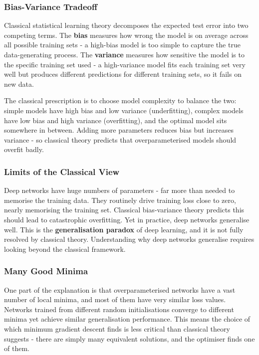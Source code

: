 \subsubsection{Bias-Variance Tradeoff}

Classical statistical learning theory decomposes the expected test error into two competing terms. The \textbf{bias} measures how wrong the model is on average across all possible training sets - a high-bias model is too simple to capture the true data-generating process. The \textbf{variance} measures how sensitive the model is to the specific training set used - a high-variance model fits each training set very well but produces different predictions for different training sets, so it fails on new data.

The classical prescription is to choose model complexity to balance the two: simple models have high bias and low variance (underfitting), complex models have low bias and high variance (overfitting), and the optimal model sits somewhere in between. Adding more parameters reduces bias but increases variance - so classical theory predicts that overparameterised models should overfit badly.

\subsubsection{Limits of the Classical View}

Deep networks have huge numbers of parameters - far more than needed to memorise the training data. They routinely drive training loss close to zero, nearly memorising the training set. Classical bias-variance theory predicts this should lead to catastrophic overfitting. Yet in practice, deep networks generalise well. This is the \textbf{generalisation paradox} of deep learning, and it is not fully resolved by classical theory. Understanding why deep networks generalise requires looking beyond the classical framework.

\subsubsection{Many Good Minima}

One part of the explanation is that overparameterised networks have a vast number of local minima, and most of them have very similar loss values. Networks trained from different random initialisations converge to different minima yet achieve similar generalisation performance. This means the choice of which minimum gradient descent finds is less critical than classical theory suggests - there are simply many equivalent solutions, and the optimiser finds one of them.

